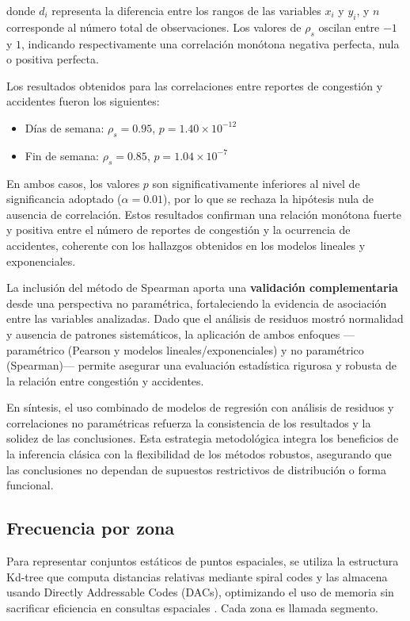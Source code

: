 \documentclass[12pt]{article}
\begin{document}
donde $d_i$ representa la diferencia entre los rangos de las variables $x_i$ y $y_i$, y $n$ corresponde al número total de observaciones. Los valores de $\rho_s$ oscilan entre $-1$ y $1$, indicando respectivamente una correlación monótona negativa perfecta, nula o positiva perfecta.

Los resultados obtenidos para las correlaciones entre reportes de congestión y accidentes fueron los siguientes:

\begin{itemize}
    \item Días de semana: $\rho_s = 0.95$, $p = 1.40 \times 10^{-12}$
    \item Fin de semana: $\rho_s = 0.85$, $p = 1.04 \times 10^{-7}$
\end{itemize}

En ambos casos, los valores $p$ son significativamente inferiores al nivel de significancia adoptado ($\alpha = 0.01$), por lo que se rechaza la hipótesis nula de ausencia de correlación. Estos resultados confirman una relación monótona fuerte y positiva entre el número de reportes de congestión y la ocurrencia de accidentes, coherente con los hallazgos obtenidos en los modelos lineales y exponenciales.

La inclusión del método de Spearman aporta una \textbf{validación complementaria} desde una perspectiva no paramétrica, fortaleciendo la evidencia de asociación entre las variables analizadas. Dado que el análisis de residuos mostró normalidad y ausencia de patrones sistemáticos, la aplicación de ambos enfoques —paramétrico (Pearson y modelos lineales/exponenciales) y no paramétrico (Spearman)— permite asegurar una evaluación estadística rigurosa y robusta de la relación entre congestión y accidentes.

En síntesis, el uso combinado de modelos de regresión con análisis de residuos y correlaciones no paramétricas refuerza la consistencia de los resultados y la solidez de las conclusiones. Esta estrategia metodológica integra los beneficios de la inferencia clásica con la flexibilidad de los métodos robustos, asegurando que las conclusiones no dependan de supuestos restrictivos de distribución o forma funcional.


\subsection{Frecuencia por zona} \label{ssec:freq_zone}

Para representar conjuntos estáticos de puntos espaciales, se utiliza la estructura Kd-tree que computa distancias relativas mediante spiral codes y las almacena usando Directly Addressable Codes (DACs), optimizando el uso de memoria sin sacrificar eficiencia en consultas espaciales \parencite{gutierrez2023ckdtree}. Cada zona es llamada segmento.
\end{document}
